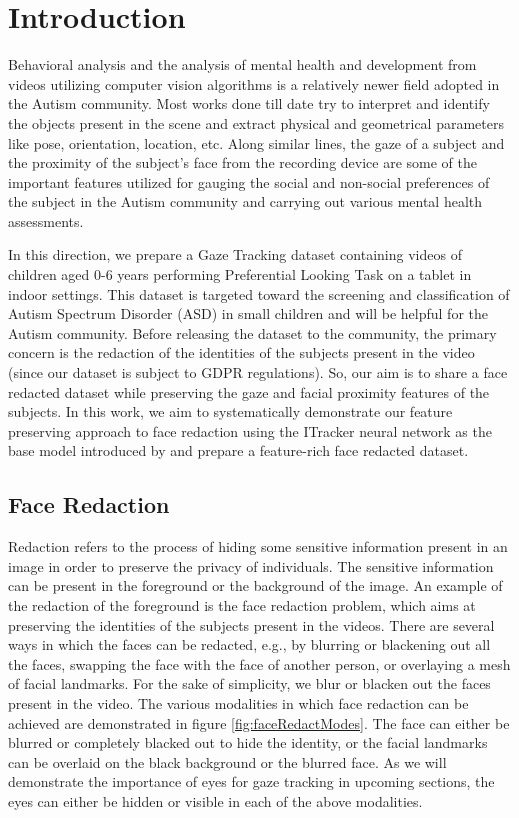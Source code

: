 \chapter{Introduction}

Behavioral analysis and the analysis of mental health and development from videos utilizing computer vision algorithms is a relatively newer field adopted in the Autism community. Most works done till date try to interpret and identify the objects present in the scene and extract physical and geometrical parameters like pose, orientation, location, etc. Along similar lines, the gaze of a subject and the proximity of the subject’s face from the recording device are some of the important features utilized for gauging the social and non-social preferences of the subject in the Autism community and carrying out various mental health assessments.

In this direction, we prepare a Gaze Tracking dataset containing videos of children aged 0-6 years performing Preferential Looking Task on a tablet in indoor settings. This dataset is targeted toward the screening and classification of Autism Spectrum Disorder (ASD) in small children and will be helpful for the Autism community. Before releasing the dataset to the community, the primary concern is the redaction of the identities of the subjects present in the video (since our dataset is subject to GDPR regulations). So, our aim is to share a face redacted dataset while preserving the gaze and facial proximity features of the subjects. In this work, we aim to systematically demonstrate our feature preserving approach to face redaction using the ITracker neural network as the base model introduced by \cite{MIT_EyeTracking_paper} and prepare a feature-rich face redacted dataset.


\section{Face Redaction}
Redaction refers to the process of hiding some sensitive information present in an image in order to preserve the privacy of individuals. The sensitive information can be present in the foreground or the background of the image. An example of the redaction of the foreground is the face redaction problem, which aims at preserving the identities of the subjects present in the videos. There are several ways in which the faces can be redacted, e.g., by blurring or blackening out all the faces, swapping the face with the face of another person, or overlaying a mesh of facial landmarks. For the sake of simplicity, we blur or blacken out the faces present in the video. The various modalities in which face redaction can be achieved are demonstrated in figure \ref{fig:faceRedactModes}. The face can either be blurred or completely blacked out to hide the identity, or the facial landmarks can be overlaid on the black background or the blurred face. As we will demonstrate the importance of eyes for gaze tracking in upcoming sections, the eyes can either be hidden or visible in each of the above modalities.

